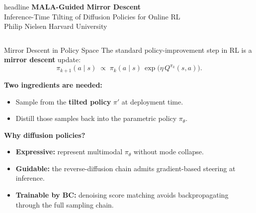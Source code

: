 \documentclass[final,hyperref={pdfpagelabels=false}]{beamer}
\newlength{\colwidth}
\begin{document}
\begin{frame}[t]

\begin{beamercolorbox}[wd=\paperwidth,ht=8.5cm]{headline}
\vspace{0.7cm}
\centering
{\fontsize{68}{76}\selectfont\bfseries MALA-Guided Mirror Descent}\\[0.5cm]
{\fontsize{36}{44}\selectfont Inference-Time Tilting of Diffusion Policies for Online RL}\\[0.7cm]
{\fontsize{30}{38}\selectfont Philip Nielsen \hspace{3cm} Harvard University}\\[0.3cm]
\end{beamercolorbox}

\vspace{0.6cm}

\begin{columns}[t]

\begin{column}{\colwidth}

\begin{block}{\Large Mirror Descent in Policy Space}
The standard policy-improvement step in RL is a \textbf{mirror descent} update:
\[
  \pi_{k+1}(a\mid s)\;\propto\;\pi_k(a\mid s)\,\exp\!\bigl(\eta\, Q^{\pi_k}(s,a)\bigr).
\]

\vspace{0.4em}
\textbf{Two ingredients are needed:}
\begin{itemize}
    \item Sample from the \textbf{tilted policy} $\pi'$ at deployment time.
    \item Distill those samples back into the parametric policy $\pi_\theta$.
\end{itemize}

\vspace{0.4em}
\textbf{Why diffusion policies?}
\begin{itemize}
    \item \textbf{Expressive:} represent multimodal $\pi_\theta$ without mode collapse.
    \item \textbf{Guidable:} the reverse-diffusion chain admits gradient-based steering at inference.
    \item \textbf{Trainable by BC:} denoising score matching avoids backpropagating through the full sampling chain.
\end{itemize}


\end{block}
\end{column}
\end{columns}
\end{frame}
\end{document}
